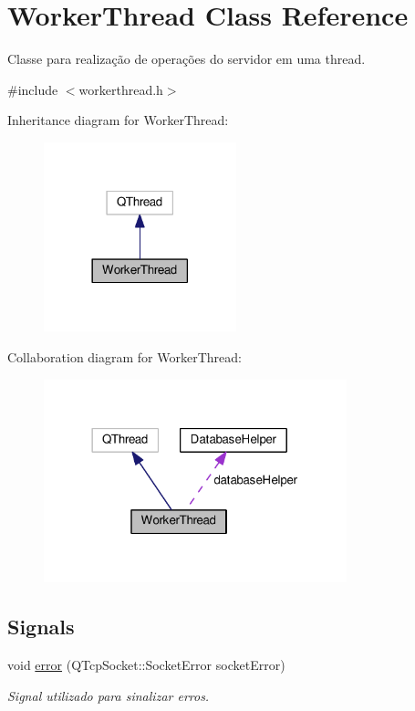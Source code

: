\hypertarget{classWorkerThread}{}\section{Worker\+Thread Class Reference}
\label{classWorkerThread}


Classe para realização de operações do servidor em uma thread.  




{\ttfamily \#include $<$workerthread.\+h$>$}



Inheritance diagram for Worker\+Thread\+:\nopagebreak
\begin{figure}[H]
\begin{center}
\leavevmode
\includegraphics[width=158pt]{d3/da8/classWorkerThread__inherit__graph}
\end{center}
\end{figure}


Collaboration diagram for Worker\+Thread\+:\nopagebreak
\begin{figure}[H]
\begin{center}
\leavevmode
\includegraphics[width=249pt]{de/d07/classWorkerThread__coll__graph}
\end{center}
\end{figure}
\subsection*{Signals}
\begin{DoxyCompactItemize}
\item 
void \hyperlink{classWorkerThread_a8b1ad08936a109f898f566cc2531515b}{error} (Q\+Tcp\+Socket\+::\+Socket\+Error socket\+Error)
\begin{DoxyCompactList}\small\item\em Signal utilizado para sinalizar erros. \end{DoxyCompactList}\end{DoxyCompactItemize}
